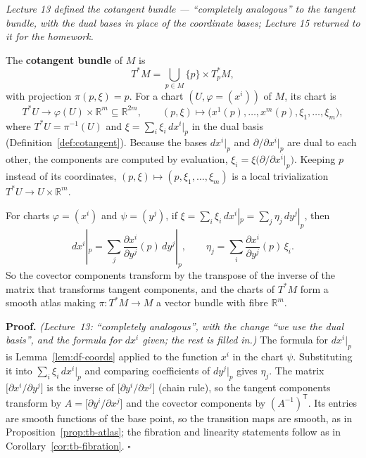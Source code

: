 \documentclass[11pt]{report}
\makeatletter
\newcounter{defcounter}[section]
\newcounter{thmcounter}[section]
\renewenvironment{proof}[1][Proof]{\noindent\textbf{#1.} }{\hfill$\square$\par\vspace{5pt}}
\newcommand{\thmlabel}[1]{\edef\@currentlabel{\arabic{section}.\arabic{thmcounter}}\label{#1}}
\newcommand{\deflabel}[1]{\edef\@currentlabel{\arabic{section}.\arabic{defcounter}}\label{#1}}
\newcommand{\leeref}[1]{\par\smallskip{\raggedleft\footnotesize\textsc{Lee}:\ #1\par}}
\makeatother
\begin{document}
\textit{Lecture 13 defined the cotangent bundle --- ``completely analogous'' to the tangent bundle, with the dual bases in place of the coordinate bases; Lecture 15 returned to it for the homework.}

\begin{defbox}\deflabel{def:cotangent-bundle}
The \textbf{cotangent bundle} of $M$ is
\[
T^*M = \bigcup_{p \in M} \{p\} \times T_p^*M,
\]
with projection $\pi(p, \xi) = p$. For a chart $(U, \varphi = (x^i))$ of $M$, its chart is
\[
T^*U \longrightarrow \varphi(U) \times \mathbb{R}^m \subseteq \mathbb{R}^{2m}, \qquad (p, \xi) \longmapsto \big(x^1(p), \ldots, x^m(p), \xi_1, \ldots, \xi_m\big),
\]
where $T^*U = \pi^{-1}(U)$ and $\xi = \sum_i \xi_i\, dx^i|_p$ in the dual basis (Definition~\ref{def:cotangent}). Because the bases $dx^i|_p$ and $\partial/\partial x^i|_p$ are dual to each other, the components are computed by evaluation, $\xi_i = \xi\big(\partial/\partial x^i|_p\big)$. Keeping $p$ instead of its coordinates, $(p, \xi) \mapsto (p, \xi_1, \ldots, \xi_m)$ is a local trivialization $T^*U \to U \times \mathbb{R}^m$.
\leeref{Proposition 11.9}
\end{defbox}

\begin{propbox}\thmlabel{prop:cotangent-transition}
For charts $\varphi = (x^i)$ and $\psi = (y^j)$, if $\xi = \sum_i \xi_i\, dx^i|_p = \sum_j \eta_j\, dy^j|_p$, then
\[
dx^i|_p = \sum_j \frac{\partial x^i}{\partial y^j}(p)\, dy^j|_p, \qquad \eta_j = \sum_i \frac{\partial x^i}{\partial y^j}(p)\, \xi_i .
\]
So the covector components transform by the transpose of the inverse of the matrix that transforms tangent components, and the charts of $T^*M$ form a smooth atlas making $\pi : T^*M \to M$ a vector bundle with fibre $\mathbb{R}^m$.
\leeref{Proposition 11.9}
\end{propbox}

\begin{proof}
\textit{(Lecture~13: ``completely analogous'', with the change ``we use the dual basis'', and the formula for $dx^i$ given; the rest is filled in.)} The formula for $dx^i|_p$ is Lemma~\ref{lem:df-coords} applied to the function $x^i$ in the chart $\psi$. Substituting it into $\sum_i \xi_i\, dx^i|_p$ and comparing coefficients of $dy^j|_p$ gives $\eta_j$. The matrix $\big[\partial x^i/\partial y^j\big]$ is the inverse of $\big[\partial y^i/\partial x^j\big]$ (chain rule), so the tangent components transform by $A = \big[\partial y^i/\partial x^j\big]$ and the covector components by $(A^{-1})^{\mathsf T}$. Its entries are smooth functions of the base point, so the transition maps are smooth, as in Proposition~\ref{prop:tb-atlas}; the fibration and linearity statements follow as in Corollary~\ref{cor:tb-fibration}.
\end{proof}
\end{document}
